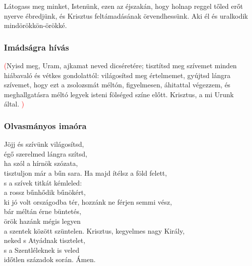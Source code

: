 \documentclass[twoside]{article}
\begin{document}


Látogass meg minket, Istenünk, ezen az éjszakán, hogy holnap reggel tőled erőt nyerve ébredjünk, és Krisztus feltámadásának örvendhessünk. Aki él és uralkodik mindörökkön-örökké.



\subsubsection*{Imádságra hívás}

\textcolor{red}{(}Nyisd meg, Uram, ajkamat neved dicséretére; tisztítsd meg szívemet minden
hiába\-való és vétkes gondolattól: világosítsd meg értelmemet, gyújtsd lángra szívemet, hogy ezt a zsolozsmát méltón, figyelmesen, áhitattal végezzem, és meghallgatásra méltó legyek isteni fölséged színe előtt. Krisztus, a mi Urunk által. \textcolor{red}{)}


\begin{gregosheet}
\end{gregosheet}

\subsubsection*{Olvasmányos imaóra}

\begin{hymnstanzas}
    Jöjj és szívünk világosítsd,\\
    égő szerelmed lángra szítsd,\\
    ha szól a hírnök szózata,\\
    tisztuljon már a bűn sara.
\stanzabreak
    Ha majd ítélsz a föld felett,\\
    s a szívek titkát kémleled:\\
    a rossz bűnhődik bűnökért,\\
    ki jó volt országodba tér,
\stanzabreak
    hozzánk ne férjen semmi vész,\\
    bár méltán érne büntetés,\\
    örök hazánk mégis legyen\\
    a szentek között szüntelen.
\stanzabreak
    Krisztus, kegyelmes nagy Király,\\
    neked s Atyádnak tisztelet,\\
    s a Szentléleknek is veled\\
    időtlen századok során. Ámen.
\end{hymnstanzas}
\end{document}
